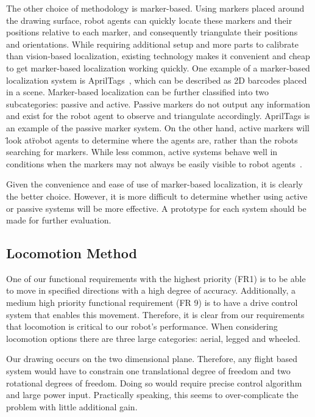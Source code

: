 The other choice of methodology is marker-based. Using markers placed around the drawing surface, robot agents can quickly locate these markers and their positions relative to each marker, and consequently triangulate their positions and orientations. While requiring additional setup and more parts to calibrate than vision-based localization, existing technology makes it convenient and cheap to get marker-based localization working quickly. One example of a marker-based localization system is AprilTags~\cite{olson2011apriltag}, which can be described as 2D barcodes placed in a scene. Marker-based localization can be further classified into two subcategories: passive and active. Passive markers do not output any information and exist for the robot agent to observe and triangulate accordingly. AprilTags is an example of the passive marker system. On the other hand, active markers will \"look at\" robot agents to determine where the agents are, rather than the robots searching for markers. While less common, active systems behave well in conditions when the markers may not always be easily visible to robot agents~\cite{cassinis2005active}.

Given the convenience and ease of use of marker-based localization, it is clearly the better choice. However, it is more difficult to determine whether using active or passive systems will be more effective. A prototype for each system should be made for further evaluation.

\subsection{Locomotion Method}
\label{sec:trade_locomotion}
One of our functional requirements with the highest priority (FR1) is to be able to move in specified directions with a high degree of accuracy. Additionally, a medium high priority functional requirement (FR 9) is to have a drive control system that enables this movement. Therefore, it is clear from our requirements that locomotion is critical to our robot's performance. When considering locomotion options there are three large categories: aerial, legged and wheeled. 

Our drawing occurs on the two dimensional plane. Therefore, any flight based system would have to constrain one translational degree of freedom and two rotational degrees of freedom. Doing so would require precise control algorithm and large power input. Practically speaking, this seems to over-complicate the problem with little additional gain. 

